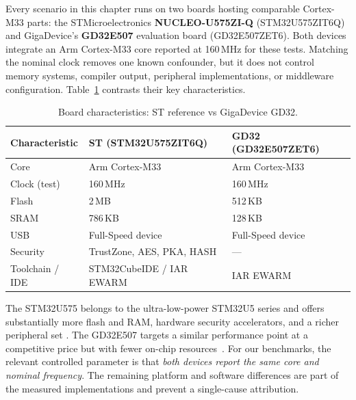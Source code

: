 Every scenario in this chapter runs on two boards hosting comparable Cortex-M33 parts: the
STMicroelectronics \textbf{NUCLEO-U575ZI-Q} (STM32U575ZIT6Q) and GigaDevice's
\textbf{GD32E507} evaluation board (GD32E507ZET6). Both devices integrate an Arm Cortex-M33
core reported at 160\,MHz for these tests. Matching the nominal clock removes one known
confounder, but it does not control memory systems, compiler output, peripheral
implementations, or middleware configuration.
Table~\ref{tab:gd32-boards} contrasts their key characteristics.

\begin{table}[H]
  \centering
  \caption{Board characteristics: ST reference vs GigaDevice GD32.}
  \label{tab:gd32-boards}
  \begin{tabularx}{\textwidth}{l X X}
    \toprule
    \textbf{Characteristic} & \textbf{ST (STM32U575ZIT6Q)} & \textbf{GD32 (GD32E507ZET6)} \\
    \midrule
    Core              & Arm Cortex-M33              & Arm Cortex-M33 \\
    Clock (test)      & 160\,MHz                    & 160\,MHz \\
    Flash             & 2\,MB                       & 512\,KB \\
    SRAM              & 786\,KB                     & 128\,KB \\
    USB               & Full-Speed device            & Full-Speed device \\
    Security          & TrustZone, AES, PKA, HASH    & --- \\
    Toolchain / IDE   & STM32CubeIDE / IAR EWARM     & IAR EWARM \\
    \bottomrule
  \end{tabularx}
\end{table}

The STM32U575 belongs to the ultra-low-power STM32U5 series and offers substantially more
flash and RAM, hardware security accelerators, and a richer peripheral set
\cite{stm32u575-ds}. The GD32E507 targets a similar performance point at a competitive
price but with fewer on-chip resources~\cite{gd32e507-ds}. For our benchmarks, the
relevant controlled parameter is that \emph{both devices report the same core and nominal
frequency}. The remaining platform and software differences are part of the measured
implementations and prevent a single-cause attribution.

